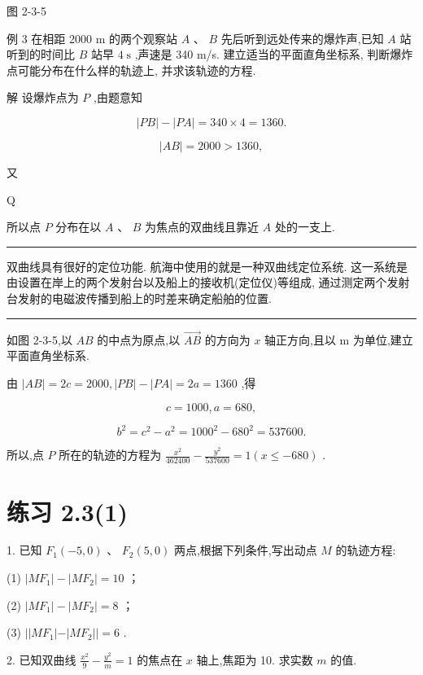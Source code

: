 \documentclass[10pt]{article}
\newcommand{\HRule}{\begin{center}\rule{0.9\linewidth}{0.2mm}\end{center}}
\begin{document}
图 2-3-5

例 3 在相距 2000 m 的两个观察站 \(A\) 、 \(B\) 先后听到远处传来的爆炸声,已知 \(A\) 站听到的时间比 \(B\) 站早 \(4\mathrm{\;s}\) ,声速是 340 m/s. 建立适当的平面直角坐标系, 判断爆炸点可能分布在什么样的轨迹上, 并求该轨迹的方程.

解 设爆炸点为 \(P\) ,由题意知

\[
\left| {PB}\right|  - \left| {PA}\right|  = {340} \times  4 = {1360}.
\]

\[
\left| {AB}\right|  = {2000} > {1360},
\]

又

Q

所以点 \(P\) 分布在以 \(A\text{ 、 }B\) 为焦点的双曲线且靠近 \(A\) 处的一支上.

\HRule

双曲线具有很好的定位功能. 航海中使用的就是一种双曲线定位系统. 这一系统是由设置在岸上的两个发射台以及船上的接收机(定位仪)等组成, 通过测定两个发射台发射的电磁波传播到船上的时差来确定船舶的位置.

\HRule

如图 2-3-5,以 \({AB}\) 的中点为原点,以 \(\overrightarrow{AB}\) 的方向为 \(x\) 轴正方向,且以 \(\mathrm{m}\) 为单位,建立平面直角坐标系.

由 \(\left| {AB}\right|  = {2c} = {2000},\left| {PB}\right|  - \left| {PA}\right|  = {2a} = {1360}\) ,得

\[
c = {1000},a = {680},
\]

\[
{b}^{2} = {c}^{2} - {a}^{2} = {1000}^{2} - {680}^{2} = {537600}.
\]

所以,点 \(P\) 所在的轨迹的方程为 \(\frac{{x}^{2}}{462400} - \frac{{y}^{2}}{537600} = 1\left( {x \leq   - {680}}\right)\) .

\section*{练习 2.3(1)}

1. 已知 \({F}_{1}\left( {-5,0}\right) \text{ 、 }{F}_{2}\left( {5,0}\right)\) 两点,根据下列条件,写出动点 \(M\) 的轨迹方程:

(1) \(\left| {M{F}_{1}}\right|  - \left| {M{F}_{2}}\right|  = {10}\) ；

(2) \(\left| {M{F}_{1}}\right|  - \left| {M{F}_{2}}\right|  = 8\) ；

(3) \(\left| \right| M{F}_{1}\left| -\right| M{F}_{2}\left| \right|  = 6\) .

2. 已知双曲线 \(\frac{{x}^{2}}{9} - \frac{{y}^{2}}{m} = 1\) 的焦点在 \(x\) 轴上,焦距为 10. 求实数 \(m\) 的值.
\end{document}
